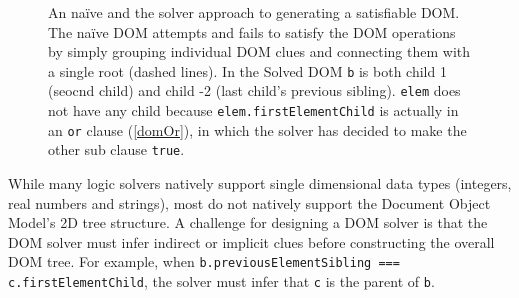 \begin{figure}[ht]
\centerline{}
\caption[Naive vs. Solved DOM trees]{An na\"{i}ve and the solver approach to generating a satisfiable DOM.  The na\"{i}ve DOM attempts and fails to satisfy the DOM operations by simply grouping individual DOM clues and connecting them with a single root (dashed lines).  In the Solved DOM {\tt b} is both child 1 (seocnd child) and child -2 (last child's previous sibling).  {\tt elem} does not have any child because {\tt elem.firstElementChild} is actually in an {\tt or} clause (\autoref{domOr}), in which the solver has decided to make the other sub clause {\tt true}.}
\label{trees}
\end{figure}


While many logic solvers natively support single dimensional data types (integers, real numbers and strings), most do not natively support the Document Object Model's 2D tree structure.
A challenge for designing a DOM solver is that the DOM solver must infer indirect or implicit clues before constructing the overall DOM tree.  
For example, when {\tt b.previousElementSibling === c.firstElementChild}, the solver must infer that {\tt c} is the parent of {\tt b}.  


